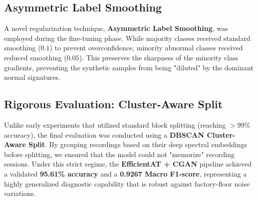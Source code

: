\subsection{Asymmetric Label Smoothing}
A novel regularization technique, \textbf{Asymmetric Label Smoothing}, was employed during the fine-tuning phase. While majority classes received standard smoothing ($0.1$) to prevent overconfidence, minority abnormal classes received reduced smoothing ($0.05$). This preserves the sharpness of the minority class gradients, preventing the synthetic samples from being "diluted" by the dominant normal signatures.

\subsection{Rigorous Evaluation: Cluster-Aware Split}
Unlike early experiments that utilized standard block splitting (reaching $>99\%$ accuracy), the final evaluation was conducted using a \textbf{DBSCAN Cluster-Aware Split}. By grouping recordings based on their deep spectral embeddings before splitting, we ensured that the model could not "memorize" recording sessions. Under this strict regime, the \textbf{EfficientAT + CGAN} pipeline achieved a validated \textbf{95.61\% accuracy} and a \textbf{0.9267 Macro F1-score}, representing a highly generalized diagnostic capability that is robust against factory-floor noise variations.

